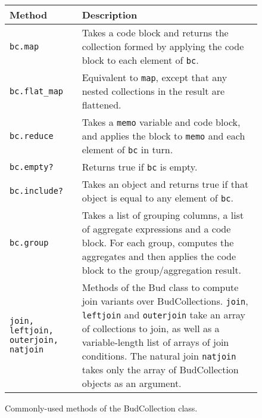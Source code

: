 \begin{figure}
	\begin{small}
	\begin{tabular}{|p{0.65in}|p{2.35in}|}
		\hline
		Method & Description\\
		\hline
		\texttt{bc.map} & Takes a code block and returns the collection formed by applying the code block to each element of \texttt{bc}.\\
		\texttt{bc.flat\_map} & Equivalent to \texttt{map}, except that any
        nested collections in the result are flattened.\\
		\texttt{bc.reduce} & Takes a \texttt{memo} variable and code block, and applies the block to \texttt{memo} and each element of \texttt{bc} in turn.\\
		\texttt{bc.empty?} & Returns true if \texttt{bc} is empty.\\
    \texttt{bc.include?} & Takes an object and returns true if that object is equal to any element of \texttt{bc}.\\
		\texttt{bc.group} & Takes a list of grouping columns, a list of
        aggregate expressions and a code block. For each group, computes the
        aggregates and then applies the code block to the group/aggregation result.\\
		\hline \hline
		\texttt{join, leftjoin, outerjoin, natjoin} & Methods of the Bud class
        to compute join variants over BudCollections.  \texttt{join},
        \texttt{leftjoin} and \texttt{outerjoin} take an array of collections to join, as well as a variable-length list of arrays of join conditions.  The natural join \texttt{natjoin} takes only the array of BudCollection objects as an argument.\\
		\hline
	\end{tabular}
\end{small}
\caption{Commonly-used methods of the BudCollection class.}
\label{tab:collmethods}
\end{figure}

